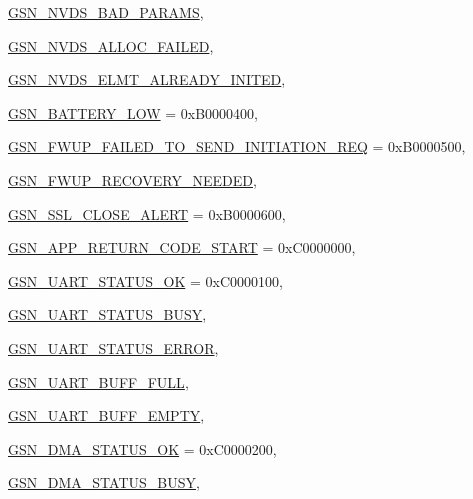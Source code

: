 \begin{DoxyCompactItemize}
\par
\hyperlink{a00659_gga476ae1caf992f8287176b2cc414c8707a2e8a700dee5ddcc6ecdec80a1ada8eff}{GSN\_\-NVDS\_\-BAD\_\-PARAMS}, 
\par
\hyperlink{a00659_gga476ae1caf992f8287176b2cc414c8707a87b3d3e5582de3a30a79a7221d4f37ef}{GSN\_\-NVDS\_\-ALLOC\_\-FAILED}, 
\par
\hyperlink{a00659_gga476ae1caf992f8287176b2cc414c8707ab05b1be1a92406332c4dcb37495f52aa}{GSN\_\-NVDS\_\-ELMT\_\-ALREADY\_\-INITED}, 
\par
\hyperlink{a00659_gga476ae1caf992f8287176b2cc414c8707a41697e2b124c9f5cb6b603760c5c8d73}{GSN\_\-BATTERY\_\-LOW} =  0xB0000400, 
\par
\hyperlink{a00659_gga476ae1caf992f8287176b2cc414c8707a536840c09ce54ca8f42dd322a65e571d}{GSN\_\-FWUP\_\-FAILED\_\-TO\_\-SEND\_\-INITIATION\_\-REQ} =  0xB0000500, 
\par
\hyperlink{a00659_gga476ae1caf992f8287176b2cc414c8707a51931f93c1276a07391c5211a0a2af83}{GSN\_\-FWUP\_\-RECOVERY\_\-NEEDED}, 
\par
\hyperlink{a00659_gga476ae1caf992f8287176b2cc414c8707a1ae2f602601c58011635de1fa0276394}{GSN\_\-SSL\_\-CLOSE\_\-ALERT} =  0xB0000600, 
\par
\hyperlink{a00659_gga476ae1caf992f8287176b2cc414c8707a1b773f03003e4a584d03028fc62a9ca9}{GSN\_\-APP\_\-RETURN\_\-CODE\_\-START} =  0xC0000000, 
\par
\hyperlink{a00659_gga476ae1caf992f8287176b2cc414c8707ab30124a198f96ecae0ef1bee80cc0130}{GSN\_\-UART\_\-STATUS\_\-OK} =  0xC0000100, 
\par
\hyperlink{a00659_gga476ae1caf992f8287176b2cc414c8707a81c4ae50b1a9af34e521dd80347de5d3}{GSN\_\-UART\_\-STATUS\_\-BUSY}, 
\par
\hyperlink{a00659_gga476ae1caf992f8287176b2cc414c8707a22bc4731bca9188f3d9001b69c349f5c}{GSN\_\-UART\_\-STATUS\_\-ERROR}, 
\par
\hyperlink{a00659_gga476ae1caf992f8287176b2cc414c8707ad3a46887bde88aa698d160c80935838d}{GSN\_\-UART\_\-BUFF\_\-FULL}, 
\par
\hyperlink{a00659_gga476ae1caf992f8287176b2cc414c8707a4d787651d018dcdd087347ded4469a5a}{GSN\_\-UART\_\-BUFF\_\-EMPTY}, 
\par
\hyperlink{a00659_gga476ae1caf992f8287176b2cc414c8707a3c45c26b1877d1d7634c0abc3d11183b}{GSN\_\-DMA\_\-STATUS\_\-OK} =  0xC0000200, 
\par
\hyperlink{a00659_gga476ae1caf992f8287176b2cc414c8707a90fcdff06b4ecb1e25f8cc4487015a0e}{GSN\_\-DMA\_\-STATUS\_\-BUSY}, 

\end{DoxyCompactItemize}
